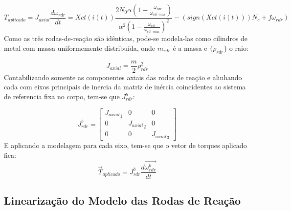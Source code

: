 \begin{equation}
T_{aplicado}=J_{axial}\frac{d\omega_{rdr}}{dt}=Xct(i(t))\frac{2N_0\alpha\left (1-\frac{\omega_{rdr}}{\omega_{rdr\;max}} \right )}{\alpha^2\left (1-\frac{\omega_{rdr}}{\omega_{rdr\;max}} \right )^2}-\left (sign(Xct(i(t)))N_c+f\omega_{rdr}\right )
\end{equation}
Como as três rodas-de-reação são idênticas, pode-se modela-las como cilindros de metal com massa uniformemente distribuída, onde $m_{rdr}$ é a massa e $\{\rho_{rdr}\}$ o raio:

\begin{equation}{J_{axial}}=\frac{m}{2}\rho^2_{rdr}\end{equation}Contabilizando somente as componentes axiais das rodas de reação e alinhando cada com eixos principais de inercia da matriz de inércia coincidentes ao sistema de referencia fixa no corpo, tem-se que   $J^b_{rdr}$:

\begin{equation}J^b_{rdr} =\begin{bmatrix}
{J_{axial}}_1&0&0 \\0 &{J_{axial}}_2&0 \\ 0&0&{J_{axial}}_3
\end{bmatrix}\end{equation}E aplicando a modelagem para cada eixo, tem-se que o vetor de torques aplicado fica:
\begin{equation}
\vec{T}_{aplicado}=J^b_{rdr}\frac{d\vec{\omega^b_{rdr}}}{dt}
\end{equation}


\subsection{Linearização do Modelo das Rodas de Reação}\label{sec:3.1.6.3}




